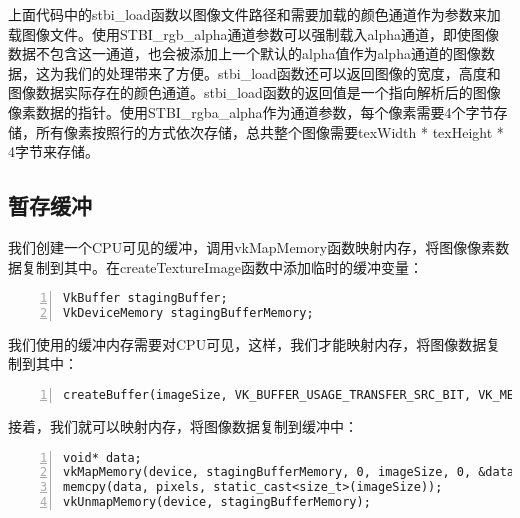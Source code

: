 \documentclass{ctexart}
\begin{document}
上面代码中的stbi\_load函数以图像文件路径和需要加载的颜色通道作为参数来加载图像文件。使用STBI\_rgb\_alpha通道参数可以强制载入alpha通道，即使图像数据不包含这一通道，也会被添加上一个默认的alpha值作为alpha通道的图像数据，这为我们的处理带来了方便。stbi\_load函数还可以返回图像的宽度，高度和图像数据实际存在的颜色通道。stbi\_load函数的返回值是一个指向解析后的图像像素数据的指针。使用STBI\_rgba\_alpha作为通道参数，每个像素需要4个字节存储，所有像素按照行的方式依次存储，总共整个图像需要texWidth * texHeight * 4字节来存储。

\subsection{暂存缓冲}

我们创建一个CPU可见的缓冲，调用vkMapMemory函数映射内存，将图像像素数据复制到其中。在createTextureImage函数中添加临时的缓冲变量：

\begin{lstlisting}[language={[ANSI]C},keywordstyle=\color{blue!70},commentstyle=\color{red!50!green!50!blue!50},frame=shadowbox, rulesepcolor=\color{red!20!green!20!blue!20},basicstyle=\small,numbers=left, numberstyle=\tiny,breaklines=true]
VkBuffer stagingBuffer;
VkDeviceMemory stagingBufferMemory;
\end{lstlisting}

我们使用的缓冲内存需要对CPU可见，这样，我们才能映射内存，将图像数据复制到其中：

\begin{lstlisting}[language={[ANSI]C},keywordstyle=\color{blue!70},commentstyle=\color{red!50!green!50!blue!50},frame=shadowbox, rulesepcolor=\color{red!20!green!20!blue!20},basicstyle=\small,numbers=left, numberstyle=\tiny,breaklines=true]
createBuffer(imageSize, VK_BUFFER_USAGE_TRANSFER_SRC_BIT, VK_MEMORY_PROPERTY_HOST_VISIBLE_BIT | VK_MEMORY_PROPERTY_HOST_COHERENT_BIT, stagingBuffer, stagingBufferMemory);
\end{lstlisting}

接着，我们就可以映射内存，将图像数据复制到缓冲中：

\begin{lstlisting}[language={[ANSI]C},keywordstyle=\color{blue!70},commentstyle=\color{red!50!green!50!blue!50},frame=shadowbox, rulesepcolor=\color{red!20!green!20!blue!20},basicstyle=\small,numbers=left, numberstyle=\tiny,breaklines=true]
void* data;
vkMapMemory(device, stagingBufferMemory, 0, imageSize, 0, &data);
memcpy(data, pixels, static_cast<size_t>(imageSize));
vkUnmapMemory(device, stagingBufferMemory);
\end{lstlisting}
\end{document}
